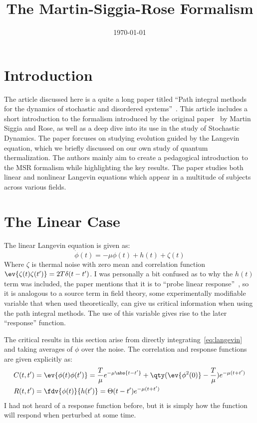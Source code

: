 \documentclass[12pt]{article}
\title{\vspace{-3em}The Martin-Siggia-Rose Formalism}
\date{\today}
\begin{document}
\maketitle

\section{Introduction}
The article discussed here is a quite a long paper titled ``Path integral methods for the dynamics of stochastic and disordered systems''~\cite{Hertz_2016}. This article includes a short introduction to the formalism introduced by the original paper~\cite{MSR_1973} by Martin Siggia and Rose, as well as a deep dive into its use in the study of Stochastic Dynamics. The paper forcuses on studying evolution guided by the Langevin equation, which we briefly discussed on our own study of quantum thermalization. The authors mainly aim to create a pedagogical introduction to the MSR formalism while highlighting the key results. The paper studies both linear and nonlinear Langevin equations which appear in a multitude of subjects across various fields.

\section{The Linear Case}
The linear Langevin equation is given as:
\begin{equation}
  \label{eq:langevin}
  \dot{\phi}(t)=-\mu\phi(t)+h(t)+\zeta(t)
\end{equation}
Where $\zeta$ is thermal noise with zero mean and correlation function $\ev{\zeta(t)\zeta(t')}=2T\delta(t-t')$. I was personally a bit confused as to why the $h(t)$ term was included, the paper mentions that it is to ``probe linear response''~\cite{Hertz_2016}, so it is analogous to a source term in field theory, some experimentally modifiable variable that when used theoretically, can give us critical information when using the path integral methods. The use of this variable gives rise to the later ``response'' function.

The critical results in this section arise from directly integrating~\eqref{eq:langevin} and taking averages of $\phi$ over the noise. The correlation and response functions are given explicitly as:
\begin{align*}
  C(t,t')&=\ev{\phi(t)\phi(t')}=\frac{T}{\mu}e^{-\mu\abs{t-t'}}
  +\qty(\ev{\phi^2(0)}-\frac{T}{\mu})e^{-\mu(t+t')}\\
  R(t,t')&=\fdv{\phi(t)}{h(t')}=\Theta(t-t')e^{-\mu(t+t')}
\end{align*}
I had not heard of a response function before, but it is simply how the function will respond when perturbed at some time.
\end{document}
